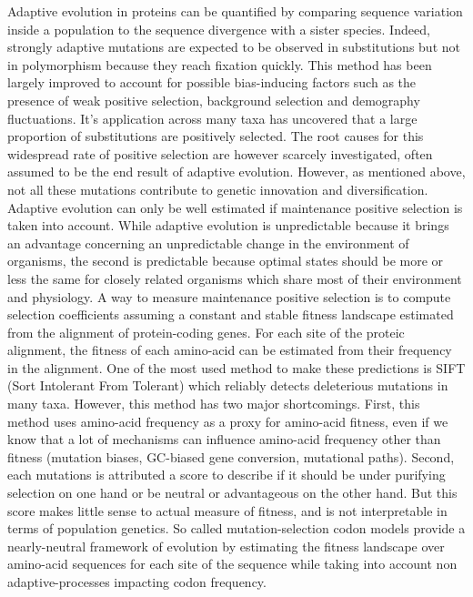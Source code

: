 \documentclass{article}
\begin{document}
    Adaptive evolution in proteins can be quantified by comparing sequence variation inside a population to the sequence divergence with a sister species\cite{mcdonald_adaptative_1991}.
    Indeed, strongly adaptive mutations are expected to be observed in substitutions but not in polymorphism because they reach fixation quickly.
    This method has been largely improved to account for possible bias-inducing factors such as the presence of weak positive selection, background selection and demography fluctuations\cite{eyre-walker_distribution_2006, eyre-walker_estimating_2009, galtier_adaptive_2016, tataru_inference_2017}.
    It's application across many taxa has uncovered that a large proportion of substitutions are positively selected\cite{moutinho_variation_2019}.
    The root causes for this widespread rate of positive selection are however scarcely investigated, often assumed to be the end result of adaptive evolution.
    However, as mentioned above, not all these mutations contribute to genetic innovation and diversification.
    Adaptive evolution can only be well estimated if maintenance positive selection is taken into account.
    While adaptive evolution is unpredictable because it brings an advantage concerning an unpredictable change in the environment of organisms, the second is predictable because optimal states should be more or less the same for closely related organisms which share most of their environment and physiology.
    A way to measure maintenance positive selection is to compute selection coefficients assuming a constant and stable fitness landscape estimated from the alignment of protein-coding genes.
    For each site of the proteic alignment, the fitness of each amino-acid can be estimated from their frequency in the alignment.
    One of the most used method to make these predictions is SIFT (Sort Intolerant From Tolerant) which reliably detects deleterious mutations in many taxa.
    However, this method has two major shortcomings.
    First, this method uses amino-acid frequency as a proxy for amino-acid fitness, even if we know that a lot of mechanisms can influence amino-acid frequency other than fitness (mutation biases, GC-biased gene conversion, mutational paths).
    Second, each mutations is attributed a score to describe if it should be under purifying selection on one hand or be neutral or advantageous on the other hand.
    But this score makes little sense to actual measure of fitness, and is not interpretable in terms of population genetics.
    So called mutation-selection codon models provide a nearly-neutral framework of evolution by estimating the fitness landscape over amino-acid sequences for each site of the sequence while taking into account non adaptive-processes impacting codon frequency\cite{ halpern_evolutionary_1998, rodrigue_mechanistic_2010, tamuri_estimating_2012}.
\end{document}
